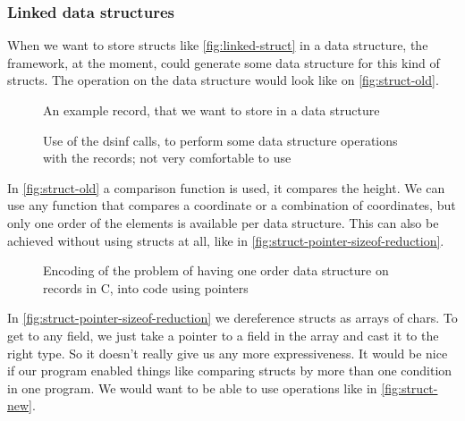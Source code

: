 \documentclass[a4paper,11pt]{article}
\begin{document}
		\subsubsection{Linked data structures}

			When we want to store structs like \autoref{fig:linked-struct} in a data structure, the
			framework, at the moment, could generate some data structure for this kind of structs. The
			operation on the data structure would look like on \autoref{fig:struct-old}.

            \begin{figure}[h!]
				

				\caption{An example record, that we want to store in a data structure}

				\label{fig:linked-struct}
			\end{figure}

            \begin{figure}[h!]
				

				\caption{Use of the dsinf calls, to perform some data structure operations with the
				records; not very comfortable to use}

				\label{fig:struct-old}
			\end{figure}

			In \autoref{fig:struct-old} a comparison function is used, it compares the height. We can use
			any function that compares a coordinate or a combination of coordinates, but only one order of
			the elements is available per data structure. This can also be achieved without using structs at
			all, like in \autoref{fig:struct-pointer-sizeof-reduction}.

            \begin{figure}[h!]
				

				\caption{Encoding of the problem of having one order data structure on records in C,
				into code using pointers}

				\label{fig:struct-pointer-sizeof-reduction}
			\end{figure}

			In \autoref{fig:struct-pointer-sizeof-reduction} we dereference structs as arrays of
			chars. To get to any field, we just take a pointer to a field in the array and cast it to the
			right type. So it doesn't really give us any more expressiveness. It would be nice if our
			program enabled things like comparing structs by more than one condition in one program. We
			would want to be able to use operations like in \autoref{fig:struct-new}.
\end{document}
